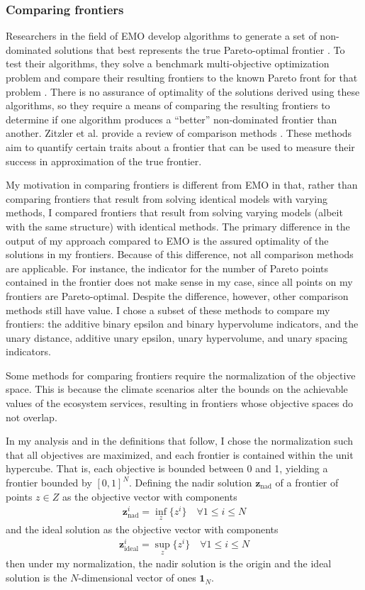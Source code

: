 \subsubsection{Comparing frontiers}
Researchers in the field of EMO develop algorithms to generate a set of non-dominated solutions that best represents the true Pareto-optimal frontier \cite{deb2001multi}. To test their algorithms, they solve a benchmark multi-objective optimization problem and compare their resulting frontiers to the known Pareto front for that problem \cite{knowles2002metrics}. There is no assurance of optimality of the solutions derived using these algorithms, so they require a means of comparing the resulting frontiers to determine if one algorithm produces a ``better'' non-dominated frontier than another. Zitzler et al. provide a review of comparison methods \cite{zitzler2003performance}. These methods aim to quantify certain traits about a frontier that can be used to measure their success in approximation of the true frontier.

My motivation in comparing frontiers is different from EMO in that, rather than comparing frontiers that result from solving identical models with varying methods, I compared frontiers that result from solving varying models (albeit with the same structure) with identical methods. The primary difference in the output of my approach compared to EMO is the assured optimality of the solutions in my frontiers. Because of this difference, not all comparison methods are applicable. For instance, the indicator for the number of Pareto points contained in the frontier does not make sense in my case, since all points on my frontiers are Pareto-optimal. Despite the difference, however, other comparison methods still have value. I chose a subset of these methods to compare my frontiers: the additive binary epsilon and binary hypervolume indicators, and the unary distance, additive unary epsilon, unary hypervolume, and unary spacing indicators.

Some methods for comparing frontiers require the normalization of the objective space. This is because the climate scenarios alter the bounds on the achievable values of the ecosystem services, resulting in frontiers whose objective spaces do not overlap.

In my analysis and in the definitions that follow, I chose the normalization such that all objectives are maximized, and each frontier is contained within the unit hypercube. That is, each objective is bounded between 0 and 1, yielding a frontier bounded by $[0,1]^N$. Defining the nadir solution $\mathbf{z}_{\text{nad}}$ of a frontier of points $z \in Z$ as the objective vector with components
\begin{align}
\mathbf{z}_{\text{nad}}^i = \inf_{z} \{ z^i \} \quad \forall 1 \le i \le N
\end{align}
and the ideal solution as the objective vector with components
\begin{align}
\mathbf{z}_{\text{ideal}}^i = \sup_{z} \{ z^i \} \quad \forall 1 \le i \le N
\end{align}
then under my normalization, the nadir solution is the origin and the ideal solution is the $N$-dimensional vector of ones $\mathbf{1}_N$.

